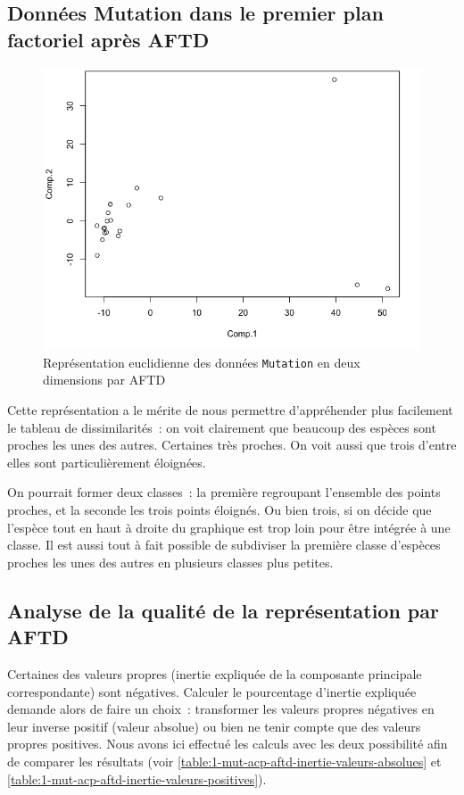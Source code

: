 \documentclass[a4paper,10pt]{report}
\begin{document}
\subsection{Données Mutation dans le premier plan factoriel après AFTD}
\label{subsection:1-3-1-mut-premier-plan-factoriel}

\begin{figure}[H]
	\centering
	\captionsetup{justification=centering, margin=4cm}
	\includegraphics[width=.5\linewidth]{img/1-mut-acp-aftd-premier-plan-factoriel}
	\caption{\small Représentation euclidienne des données \texttt{Mutation} en deux dimensions par AFTD}	
	\label{fig:1-mut-acp-aftd-deux-dimensions}%
\end{figure}


Cette représentation a le mérite de nous permettre d'appréhender plus facilement le tableau de dissimilarités~: on voit clairement que beaucoup des espèces sont proches les unes des autres. Certaines très proches. On voit aussi que trois d'entre elles sont particulièrement éloignées.

On pourrait former deux classes~: la première regroupant l'ensemble des points proches, et la seconde les trois points éloignés. Ou bien trois, si on décide que l'espèce tout en haut à droite du graphique est trop loin pour être intégrée à une classe. Il est aussi tout à fait possible de subdiviser la première classe d'espèces proches les unes des autres en plusieurs classes plus petites.




\subsection{Analyse de la qualité de la représentation par AFTD}

Certaines des valeurs propres (inertie expliquée de la composante principale correspondante) sont négatives. Calculer le pourcentage d'inertie expliquée demande alors de faire un choix~: transformer les valeurs propres négatives en leur inverse positif (valeur absolue) ou bien ne tenir compte que des valeurs propres positives. Nous avons ici effectué les calculs avec les deux possibilité afin de comparer les résultats (voir \autoref{table:1-mut-acp-aftd-inertie-valeurs-absolues} et \autoref{table:1-mut-acp-aftd-inertie-valeurs-positives}).
\end{document}
